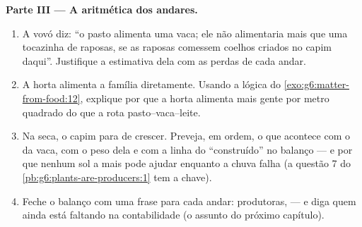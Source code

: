 \begin{problem}
\medskip\noindent\textbf{Parte III --- A aritmética dos
andares.}
\begin{enumerate}[resume]
  \item A vovó diz: ``o pasto alimenta uma vaca; ele não alimentaria
        mais que uma tocazinha de raposas, se as raposas comessem
        coelhos criados no capim daqui''. Justifique a estimativa
        dela com as perdas de cada andar.
  \item A horta alimenta a família diretamente. Usando a lógica do
        \cref{exo:g6:matter-from-food:12}, explique por que a horta
        alimenta mais gente por metro quadrado do que a rota
        pasto--vaca--leite.
  \item Na seca, o capim para de crescer. Preveja, em ordem, o que
        acontece com o  da vaca, com o peso dela e com a linha
        do ``construído'' no balanço --- e por que nenhum sol a mais
        pode ajudar enquanto a chuva falha (a questão 7 do
        \cref{pb:g6:plants-are-producers:1} tem a chave).
  \item Feche o balanço com uma frase para cada andar: produtoras,
         --- e diga quem ainda está faltando na
        contabilidade (o assunto do próximo capítulo).
\end{enumerate}
\end{problem}
